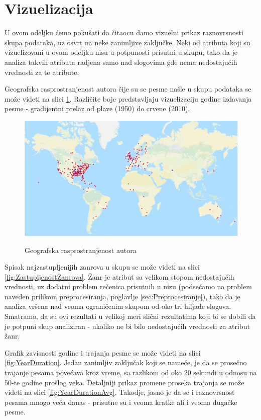 \section{Vizuelizacija}
\label{sec:Vizuelizacija}

U ovom odeljku \'c{}emo poku\v{s}ati da \v{c}itaocu damo vizuelni prikaz raznovrsnosti skupa podataka, uz osvrt na neke zanimljive zaklju\v{c}ke. Neki od atributa koji su vizuelizovani u ovom odeljku nisu u potpunosti prisutni u skupu, tako da je analiza takvih atributa radjena samo nad slogovima gde nema nedostaju\'c{}ih vrednosti za te atribute.

Geografska rasprostranjenost autora \v{c}ije su se pesme na\v{s}le u skupu podataka se mo\v{z}e videti na slici \ref{fig:Geolokacija}. Razli\v{c}ite boje predstavljaju vizuelizaciju godine izdavanja pesme - gradijentni prelaz od plave (1950) do crvene (2010).

\begin{figure}[H]
    \centering
    \includegraphics[scale=0.45]{resources/Geolokacija.png}
    \label{fig:Geolokacija}
    \caption{Geografska rasprostranjenost autora}
\end{figure}

Spisak najzastupljenijih zanrova u skupu se mo\v{z}e videti na slici \ref{fig:ZastupljenostZanrova}. \v{Z}anr je atribut sa velikom stopom nedostaju\'c{}ih vrednosti, uz dodatni problem re\v{c}enica prisutnih u nizu (podse\'c{}amo na problem naveden prilikom preprocesiranja, poglavlje \ref{sec:Preprocesiranje}), tako da je analiza vr\v{s}ena nad veoma ograni\v{c}enim skupom od oko tri hiljade slogova. Smatramo, da su ovi rezultati u velikoj meri sli\v{c}ni rezultatima koji bi se dobili da je potpuni skup analiziran - ukoliko ne bi bilo nedostaju\'c{}ih vrednosti za atribut \v{z}anr.

Grafik zavisnosti godine i trajanja pesme se mo\v{z}e videti na slici \ref{fig:YearDuration}. Jedan zanimljiv zaklju\v{c}ak koji se name\'c{}e, je da se prose\v{c}no trajanje pesama pove\'c{}ava kroz vreme, sa razlikom od oko 20 sekundi u odnosu na 50-te godine pro\v{s}log veka. Detaljniji prikaz promene proseka trajanja se mo\v{z}e videti na slici \ref{fig:YearDurationAvg}. Takodje, jasno je da se i raznovrsnost pesama mnogo ve\'c{}a danas - prisutne su i veoma kratke ali i veoma duga\v{c}ke pesme.

